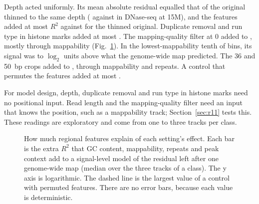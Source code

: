 \documentclass[pdflatex,sn-mathphys-num]{sn-jnl}
\newcommand{\lit}[1]{#1}
\begin{document}
Depth acted uniformly. Its mean absolute residual equalled that of the original thinned to
the same depth (\depArm{} against \depNull{} in DNase-seq at \lit{15}M), and the features added
at most \depArmFeatHi{} $R^{\lit{2}}$ against \depNullFeatHi{} for the thinned original.
Duplicate removal and run type in histone marks added at most \dedupFeatHi{}. The
mapping-quality filter at \lit{0} added \mapqZeroLo{} to \mapqZeroHi{}, mostly through
mappability (Fig.~\ref{fig:region}). In the lowest-mappability tenth of bins, its signal was
\mapqZeroDecAllLo{} to \mapqZeroDecAllHi{} $\log_{\lit{2}}$ units above what the genome-wide map
predicted. The \lit{36} and \lit{50}~bp crops added \cropFeatLo{} to \cropFeatHi{}, through
mappability and repeats. A control that permutes the features added at most \knobShufMax{}.

For model design, depth, duplicate removal and run type in histone marks need no positional
input. Read length and the mapping-quality filter need an input that knows the position, such
as a mappability track; Section~\ref{sec:r11} tests this. These readings are exploratory and
come from one to three tracks per class.

\begin{figure}[t]
\centering
{}
\caption{How much regional features explain of each setting's effect. Each bar is the extra
$R^{\lit{2}}$ that GC content, mappability, repeats and peak context add to a signal-level model of
the residual left after one genome-wide map (median over the three tracks of a class). The y
axis is logarithmic. The dashed line is the largest value of a control with permuted features.
There are no error bars, because each value is deterministic.}\label{fig:region}
\end{figure}
\end{document}
